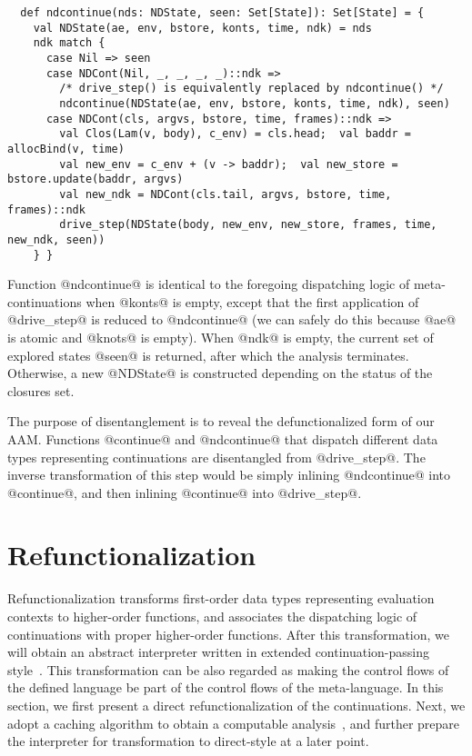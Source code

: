 \documentclass[acmsmall, screen]{acmart}\settopmatter{}
\begin{document}
\begin{lstlisting}
  def ndcontinue(nds: NDState, seen: Set[State]): Set[State] = {
    val NDState(ae, env, bstore, konts, time, ndk) = nds
    ndk match {
      case Nil => seen
      case NDCont(Nil, _, _, _, _)::ndk =>
        /* drive_step() is equivalently replaced by ndcontinue() */
        ndcontinue(NDState(ae, env, bstore, konts, time, ndk), seen)
      case NDCont(cls, argvs, bstore, time, frames)::ndk =>
        val Clos(Lam(v, body), c_env) = cls.head;  val baddr = allocBind(v, time)
        val new_env = c_env + (v -> baddr);  val new_store = bstore.update(baddr, argvs)
        val new_ndk = NDCont(cls.tail, argvs, bstore, time, frames)::ndk
        drive_step(NDState(body, new_env, new_store, frames, time, new_ndk, seen))
    } }
\end{lstlisting}

Function @ndcontinue@ is identical to the foregoing dispatching logic of meta-continuations when @konts@ is empty,
except that the first application of @drive_step@ is reduced to @ndcontinue@ (we can safely do this because 
@ae@ is atomic and @knots@ is empty).
When @ndk@ is empty, the current set of explored states @seen@ is returned, after which the analysis terminates.
Otherwise, a new @NDState@ is constructed depending on the status of the closures set.

The purpose of disentanglement is to reveal the defunctionalized form of our AAM.
Functions @continue@ and @ndcontinue@ that dispatch different data types representing
continuations are disentangled from @drive_step@.
The inverse transformation of this step would be simply inlining @ndcontinue@ into @continue@,
and then inlining @continue@ into @drive_step@.

\section{Refunctionalization} \label{sec:refunc}

Refunctionalization transforms first-order data types representing evaluation contexts
to higher-order functions, and associates the dispatching logic of continuations with
proper higher-order functions.
After this transformation, we will obtain an abstract interpreter written in extended
continuation-passing style~\cite{Danvy:1990:AC:91556.91622}.
This transformation can be also regarded as making the control flows of the defined
language be part of the control flows of the meta-language.
In this section, we first present a direct refunctionalization of the continuations.
Next, we adopt a caching algorithm to obtain a computable analysis~\cite{darais2017abstracting},
and further prepare the interpreter for transformation to direct-style at a later point.
\end{document}

